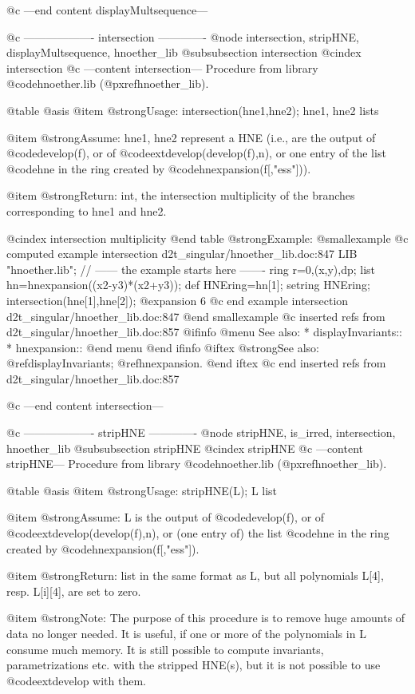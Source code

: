@c ---end content displayMultsequence---

@c ------------------- intersection -------------
@node intersection, stripHNE, displayMultsequence, hnoether_lib
@subsubsection intersection
@cindex intersection
@c ---content intersection---
Procedure from library @code{hnoether.lib} (@pxref{hnoether_lib}).

@table @asis
@item @strong{Usage:}
intersection(hne1,hne2); hne1, hne2 lists

@item @strong{Assume:}
hne1, hne2 represent a HNE (i.e., are the output of
@code{develop(f)}, or of @code{extdevelop(develop(f),n)}, or
one entry of the list @code{hne} in the ring created by
@code{hnexpansion(f[,"ess"])}).

@item @strong{Return:}
int, the intersection multiplicity of the branches corresponding to
hne1 and hne2.

@cindex intersection multiplicity
@end table
@strong{Example:}
@smallexample
@c computed example intersection d2t_singular/hnoether_lib.doc:847 
LIB "hnoether.lib";
// ------ the example starts here -------
ring r=0,(x,y),dp;
list hn=hnexpansion((x2-y3)*(x2+y3));
def HNEring=hn[1];
setring HNEring;
intersection(hne[1],hne[2]);
@expansion{} 6
@c end example intersection d2t_singular/hnoether_lib.doc:847
@end smallexample
@c inserted refs from d2t_singular/hnoether_lib.doc:857
@ifinfo
@menu
See also:
* displayInvariants::
* hnexpansion::
@end menu
@end ifinfo
@iftex
@strong{See also:}
@ref{displayInvariants};
@ref{hnexpansion}.
@end iftex
@c end inserted refs from d2t_singular/hnoether_lib.doc:857

@c ---end content intersection---

@c ------------------- stripHNE -------------
@node stripHNE, is_irred, intersection, hnoether_lib
@subsubsection stripHNE
@cindex stripHNE
@c ---content stripHNE---
Procedure from library @code{hnoether.lib} (@pxref{hnoether_lib}).

@table @asis
@item @strong{Usage:}
stripHNE(L); L list

@item @strong{Assume:}
L is the output of @code{develop(f)}, or of
@code{extdevelop(develop(f),n)}, or (one entry of) the list
@code{hne} in the ring created by @code{hnexpansion(f[,"ess"])}.

@item @strong{Return:}
list in the same format as L, but all polynomials L[4], resp.
L[i][4], are set to zero.

@item @strong{Note:}
The purpose of this procedure is to remove huge amounts of data
no longer needed. It is useful, if one or more of the polynomials
in L consume much memory. It is still possible to compute invariants,
parametrizations etc. with the stripped HNE(s), but it is not possible
to use @code{extdevelop} with them.

